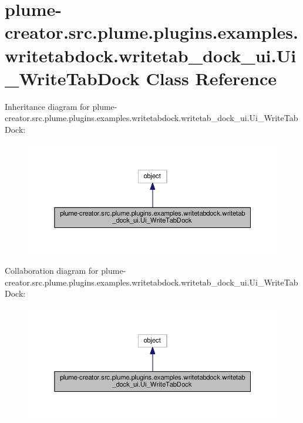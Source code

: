 \hypertarget{classplume-creator_1_1src_1_1plume_1_1plugins_1_1examples_1_1writetabdock_1_1writetab__dock__ui_1_1_ui___write_tab_dock}{}\section{plume-\/creator.src.\+plume.\+plugins.\+examples.\+writetabdock.\+writetab\+\_\+dock\+\_\+ui.\+Ui\+\_\+\+Write\+Tab\+Dock Class Reference}
\label{classplume-creator_1_1src_1_1plume_1_1plugins_1_1examples_1_1writetabdock_1_1writetab__dock__ui_1_1_ui___write_tab_dock}


Inheritance diagram for plume-\/creator.src.\+plume.\+plugins.\+examples.\+writetabdock.\+writetab\+\_\+dock\+\_\+ui.\+Ui\+\_\+\+Write\+Tab\+Dock\+:\nopagebreak
\begin{figure}[H]
\begin{center}
\leavevmode
\includegraphics[width=350pt]{classplume-creator_1_1src_1_1plume_1_1plugins_1_1examples_1_1writetabdock_1_1writetab__dock__ui_13e699310f62967c338fbd1d9da74d17}
\end{center}
\end{figure}


Collaboration diagram for plume-\/creator.src.\+plume.\+plugins.\+examples.\+writetabdock.\+writetab\+\_\+dock\+\_\+ui.\+Ui\+\_\+\+Write\+Tab\+Dock\+:\nopagebreak
\begin{figure}[H]
\begin{center}
\leavevmode
\includegraphics[width=350pt]{classplume-creator_1_1src_1_1plume_1_1plugins_1_1examples_1_1writetabdock_1_1writetab__dock__ui_7db53b9a86fdaf0feddb47b10c66de9a}
\end{center}
\end{figure}
